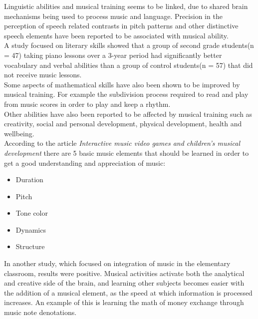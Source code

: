 	Linguistic abilities and musical training seems to be linked, due to shared brain mechanisms being used to process music and language. Precision in the perception of speech related contrasts in pitch patterns and other distinctive speech elements have been reported to be associated with musical ability\cite{languageSkills}.\\
	
	A study focused on literary skills showed that a group of second grade students(n = 47) taking piano lessons over a 3-year period had significantly better vocabulary and verbal abilities than a group of control students(n = 57) that did not receive music lessons\cite{vocabularySkills}.\\
	
	Some aspects of mathematical skills have also been shown to be improved by musical training. For example the subdivision process required to read and play from music scores in order to play and keep a rhythm\cite{powerOfMusic}.\\
	
	Other abilities have also been reported to be affected by musical training such as creativity, social and personal development, physical development, health and wellbeing\cite{powerOfMusic}.\\
	
	According to the article \textit{Interactive music video games and children's musical development} there are 5 basic music elements that should be learned in order to get a good understanding and appreciation of music\cite[p.~99]{interactiveMusicVideoGames}:
	\begin{itemize}\label{list:basicMusic}
		\item Duration
		\item Pitch
		\item Tone color
		\item Dynamics
		\item Structure\\
	\end{itemize}
	
	In another study, which focused on integration of music in the elementary classroom, results were positive. Musical activities activate both the analytical and creative side of the brain, and learning other subjects becomes easier with the addition of a musical element, as the speed at which information is processed increases. An example of this is learning the math of money exchange through music note denotations\cite{musicIntegration}.
	
